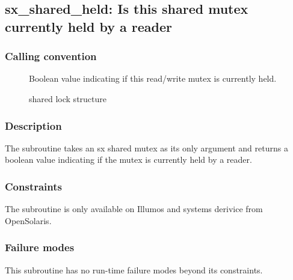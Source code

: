 \clearpage
{}
{}
\label{subr:sx-read-held}
\subsection*{sx\_shared\_held: Is this shared mutex currently held by
  a reader}

\subsubsection*{Calling convention}

\begin{description}
\item[] Boolean value indicating if this read/write
  mutex is currently held.
\item[] shared lock structure
\end{description}

\subsubsection*{Description}

The  subroutine takes an sx shared mutex as
its only argument and returns a boolean value indicating if the mutex
is currently held by a reader.

\subsubsection*{Constraints}

The  subroutine is only available on Illumos and
systems derivice from OpenSolaris.

\subsubsection*{Failure modes}

This subroutine has no run-time failure modes beyond its constraints.
